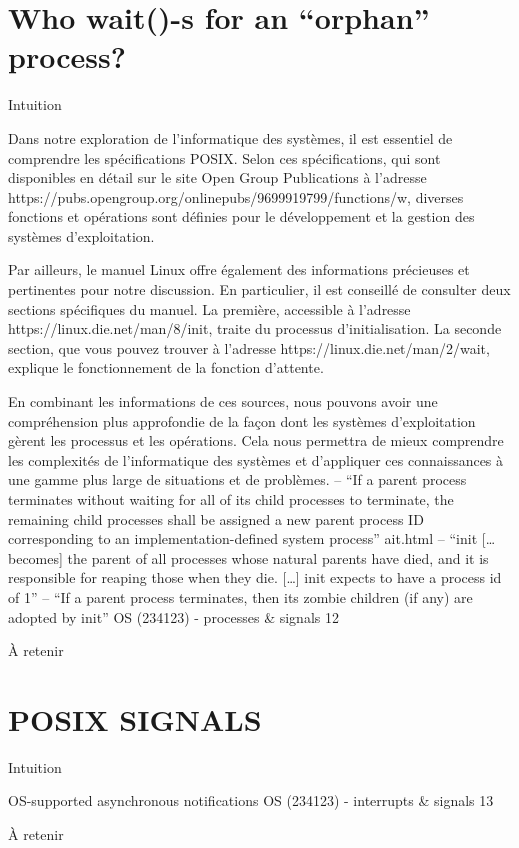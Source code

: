 \documentclass[12pt]{article}
\begin{document}
\section{Who wait()-s for an “orphan” process?}
\begin{myvulga}{Intuition}
\end{myvulga}
Dans notre exploration de l'informatique des systèmes, il est essentiel de comprendre les spécifications POSIX. Selon ces spécifications, qui sont disponibles en détail sur le site Open Group Publications à l'adresse https://pubs.opengroup.org/onlinepubs/9699919799/functions/w, diverses fonctions et opérations sont définies pour le développement et la gestion des systèmes d'exploitation.

Par ailleurs, le manuel Linux offre également des informations précieuses et pertinentes pour notre discussion. En particulier, il est conseillé de consulter deux sections spécifiques du manuel. La première, accessible à l'adresse https://linux.die.net/man/8/init, traite du processus d'initialisation. La seconde section, que vous pouvez trouver à l'adresse https://linux.die.net/man/2/wait, explique le fonctionnement de la fonction d'attente.

En combinant les informations de ces sources, nous pouvons avoir une compréhension plus approfondie de la façon dont les systèmes d'exploitation gèrent les processus et les opérations. Cela nous permettra de mieux comprendre les complexités de l'informatique des systèmes et d'appliquer ces connaissances à une gamme plus large de situations et de problèmes.
– “If a parent process terminates without waiting for all of its child
processes to terminate, the remaining child processes shall be assigned
a new parent process ID corresponding to an implementation-defined
system process”
ait.html
– “init […becomes] the parent of all processes whose natural parents
have died, and it is responsible for reaping those when they die. […]
init expects to have a process id of 1”
– “If a parent process terminates, then its zombie children (if any) are
adopted by init”
OS (234123) - processes \& signals
12
\begin{aretenir}{À retenir}
\end{aretenir}

\section{POSIX SIGNALS}
\begin{myvulga}{Intuition}
\end{myvulga}
OS-supported asynchronous notifications
OS (234123) - interrupts \& signals
13
\begin{aretenir}{À retenir}
\end{aretenir}
\end{document}
